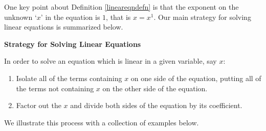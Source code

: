\documentclass{ximera}
\begin{document}
\pagebreak

One key point about Definition \ref{lineareqndefn} is that the exponent on the unknown `$x$' in the equation is $1$, that is $x = x^1$. Our main strategy for solving linear equations is summarized below.

\medskip

 \label{strategyforsolvinglineareqns}

\colorbox{ResultColor}{\bbm

\centerline{\textbf{Strategy for Solving Linear Equations}}

\vspace{0.05in}

In order to solve an equation which is linear in a given variable, say $x$:

\vspace{-0.1in}

\begin{enumerate}

\item  Isolate all of the terms containing $x$ on one side of the equation, putting all of the terms not containing $x$ on the other side of the equation.

\item  Factor out the $x$ and divide both sides of the equation by its coefficient.

\end{enumerate}

\ebm}

\medskip

We illustrate this process with a collection of examples below.
\end{document}
